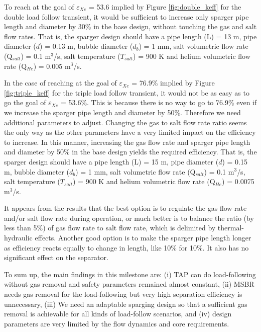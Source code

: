     To reach at the goal of $\varepsilon$$_{Xe}$ = 53.6 implied by Figure \ref{fig:double_keff} for the double load follow transient, it would be sufficient to increase only sparger pipe length and diameter by 30\% in the base design, without touching the gas and salt flow rates. That is, the sparger design should have a pipe length (L) = 13 m, pipe diameter ($d$) = 0.13 m, bubble diameter ($d_b$) = 1 mm, salt volumetric flow rate (Q$_{salt}$) = 0.1 m$^{3}$/s, salt temperature ($T_{salt}$) = 900 K and helium volumetric flow rate (Q$_{He}$) = 0.005 m$^{3}$/s.

    In the case of reaching at the goal of $\varepsilon$$_{Xe}$ = 76.9\% implied by Figure \ref{fig:triple_keff} for the triple load follow transient, it would not be as easy as to go the goal of $\varepsilon$$_{Xe}$ = 53.6\%. This is because there is no way to go to 76.9\% even if we increase the sparger pipe length and diameter by 50\%. Therefore we need additional parameters to adjust. Changing the gas to salt flow rate ratio seems the only way as the other parameters have a very limited impact on the efficiency to increase. In this manner, increasing the gas flow rate and sparger pipe length and diameter by 50\% in the base design yields the required efficiency. That is, the sparger design should have a pipe length (L) = 15 m, pipe diameter ($d$) = 0.15 m, bubble diameter ($d_b$) = 1 mm, salt volumetric flow rate (Q$_{salt}$) = 0.1 m$^{3}$/s, salt temperature ($T_{salt}$) = 900 K and helium volumetric flow rate (Q$_{He}$) = 0.0075 m$^{3}$/s.

    It appears from the results that the best option is to regulate the gas flow rate and/or salt flow rate during operation, or much better is to balance the ratio (by less than 5\%) of gas flow rate to salt flow rate, which is delimited by thermal-hydraulic effects. Another good option is to make the sparger pipe length longer as efficiency reacts equally to change in length, like 10\% for 10\%. It also has no significant effect on the separator.

    To sum up, the main findings in this milestone are: (i) TAP can do load-following without gas removal and safety parameters remained almost constant, (ii) MSBR needs gas removal for the load-following but very high separation efficiency is unnecessary, (iii) We need an adaptable sparging design so that a sufficient gas removal is achievable for all kinds of load-follow scenarios, and (iv) design parameters are very limited by the flow dynamics and core requirements.
